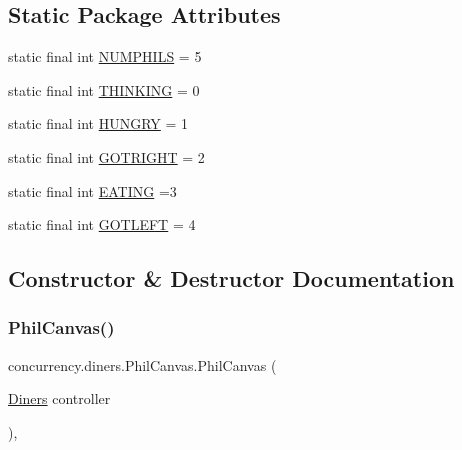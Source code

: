 \subsection*{Static Package Attributes}
\begin{DoxyCompactItemize}
\item 
static final int \mbox{\hyperlink{classconcurrency_1_1diners_1_1_phil_canvas_a3eeb58e8b150bc1715a708ef38171fd5}{N\+U\+M\+P\+H\+I\+LS}} = 5
\item 
static final int \mbox{\hyperlink{classconcurrency_1_1diners_1_1_phil_canvas_a139d7ade3fe2a78e31efdf3bc5f7bf07}{T\+H\+I\+N\+K\+I\+NG}} = 0
\item 
static final int \mbox{\hyperlink{classconcurrency_1_1diners_1_1_phil_canvas_aebfcea027e984c520629c95bfda80774}{H\+U\+N\+G\+RY}} = 1
\item 
static final int \mbox{\hyperlink{classconcurrency_1_1diners_1_1_phil_canvas_a4912c2b6fc26e79bd9ef5fbd8ab22e60}{G\+O\+T\+R\+I\+G\+HT}} = 2
\item 
static final int \mbox{\hyperlink{classconcurrency_1_1diners_1_1_phil_canvas_a73f1ebd3d60faee43b73468877245058}{E\+A\+T\+I\+NG}} =3
\item 
static final int \mbox{\hyperlink{classconcurrency_1_1diners_1_1_phil_canvas_a6263b9f80f86c6f041e3a522106f1691}{G\+O\+T\+L\+E\+FT}} = 4
\end{DoxyCompactItemize}


\subsection{Constructor \& Destructor Documentation}
\mbox{\label{classconcurrency_1_1diners_1_1_phil_canvas_af886f2636b50a61dc28021facc2a3ad3}} 
\subsubsection{\texorpdfstring{Phil\+Canvas()}{PhilCanvas()}}
{\footnotesize\ttfamily concurrency.\+diners.\+Phil\+Canvas.\+Phil\+Canvas (\begin{DoxyParamCaption}\item[{\mbox{\hyperlink{classconcurrency_1_1diners_1_1_diners}{Diners}}}]{controller }\end{DoxyParamCaption})\hspace{0.3cm}{\ttfamily [inline]}, {\ttfamily [package]}}


